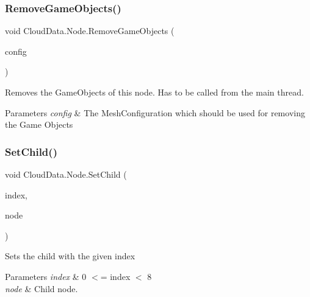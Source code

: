 \subsubsection{\texorpdfstring{Remove\+Game\+Objects()}{RemoveGameObjects()}}
{\footnotesize\ttfamily void Cloud\+Data.\+Node.\+Remove\+Game\+Objects (\begin{DoxyParamCaption}\item[{\hyperlink{class_object_creation_1_1_mesh_configuration}{Mesh\+Configuration}}]{config }\end{DoxyParamCaption})\hspace{0.3cm}{\ttfamily [inline]}}



Removes the Game\+Objects of this node. Has to be called from the main thread. 


\begin{DoxyParams}{Parameters}
{\em config} & The Mesh\+Configuration which should be used for removing the Game Objects\\
\hline
\end{DoxyParams}
\mbox{\label{class_cloud_data_1_1_node_aa4164d93a7380b4f3704c0ac36663164}} 
\subsubsection{\texorpdfstring{Set\+Child()}{SetChild()}}
{\footnotesize\ttfamily void Cloud\+Data.\+Node.\+Set\+Child (\begin{DoxyParamCaption}\item[{int}]{index,  }\item[{\hyperlink{class_cloud_data_1_1_node}{Node}}]{node }\end{DoxyParamCaption})\hspace{0.3cm}{\ttfamily [inline]}}



Sets the child with the given index 


\begin{DoxyParams}{Parameters}
{\em index} & 0 $<$= index $<$ 8\\
\hline
{\em node} & Child node.\\
\hline
\end{DoxyParams}
\mbox{\label{class_cloud_data_1_1_node_af82be4d0f143e8894ec6d2ecf4ae8c31}} 
